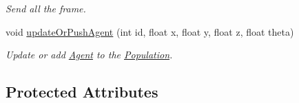 \begin{DoxyCompactItemize}
\begin{DoxyCompactList}\small\item\em Send all the frame. \end{DoxyCompactList}\item 
void \hyperlink{classUDPServer_ab1dd8ed3154b5b7b631f9ca8e4f55473}{update\+Or\+Push\+Agent} (int id, float x, float y, float z, float theta)
\begin{DoxyCompactList}\small\item\em Update or add \hyperlink{classAgent}{Agent} to the \hyperlink{classPopulation}{Population}. \end{DoxyCompactList}\end{DoxyCompactItemize}
\subsection*{Protected Attributes}
